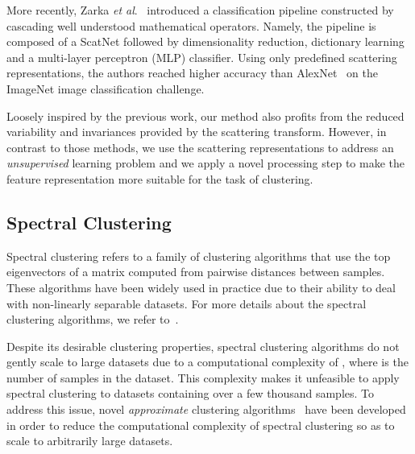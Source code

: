 \documentclass[11pt]{article}
\theoremstyle{definition}
\newcommand{\EtAl}{\textit{et al}}
\begin{document}
More recently, Zarka \EtAl.~\cite{Zarka_ScatteringHomotopyDictionaryLearningClassification_2019} introduced a classification pipeline constructed by cascading well understood mathematical operators. Namely, the pipeline is composed of a ScatNet followed by dimensionality reduction, dictionary learning and a multi-layer perceptron (MLP) classifier. Using only predefined scattering representations, the authors reached higher accuracy than AlexNet~\cite{Krizhevsky_Alexnet_2012} on the ImageNet image classification challenge. 

Loosely inspired by the previous work, our method also profits from the reduced variability and invariances provided by the scattering transform. However, in contrast to those methods, we use the scattering representations to address an \emph{unsupervised} learning problem and we apply a novel processing step to make the feature representation more suitable for the task of clustering.




\subsection{Spectral Clustering}\label{sec:spectral clustering}

Spectral clustering \cite{Ng_SpectralClustering_2002, Luxburg_SpectralClusteringTutorial_2007, Stella_MulticlassSpectralClustering_2003, Zelnik_SelfTuningSpectralClustering_2005} refers to a family of clustering algorithms that use the top eigenvectors of a matrix computed from pairwise distances between samples. These algorithms have been widely used in practice due to their ability to 
deal with non-linearly separable datasets. For more details about the spectral clustering algorithms, we refer to~\cite{Luxburg_SpectralClusteringTutorial_2007}.

Despite its desirable clustering properties, spectral clustering algorithms do not gently scale to large datasets due to a computational complexity of , where  is the number of samples in the dataset. This complexity makes it unfeasible to apply spectral clustering to datasets containing over a few thousand samples. To address this issue, novel \emph{approximate} clustering algorithms~\cite{Huang_UltraScalableSpectralClustering_2019, Yan_FastApproximateSpectralClustering_2009, He_FastSpectralClusteringExplicitFeatureMapping_2018} have been developed in order to reduce the computational complexity of spectral clustering so as to scale to arbitrarily large datasets.
\end{document}
